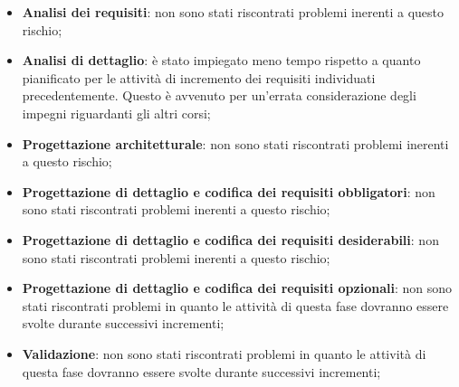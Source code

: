 			\begin{itemize}
				\item \textbf{Analisi dei requisiti}: non sono stati riscontrati problemi inerenti a questo rischio;
				\item \textbf{Analisi di dettaglio}: è stato impiegato meno tempo rispetto a quanto pianificato per le attività di incremento dei requisiti individuati precedentemente. Questo è avvenuto per un'errata considerazione degli impegni riguardanti gli altri corsi;
				\item \textbf{Progettazione architetturale}: non sono stati riscontrati problemi inerenti a questo rischio;
				\item \textbf{Progettazione di dettaglio e codifica dei requisiti obbligatori}: non sono stati riscontrati problemi inerenti a questo rischio;
				\item \textbf{Progettazione di dettaglio e codifica dei requisiti desiderabili}: non sono stati riscontrati problemi inerenti a questo rischio;
				\item \textbf{Progettazione di dettaglio e codifica dei requisiti opzionali}: non sono stati riscontrati problemi in quanto le attività di questa fase dovranno essere svolte durante successivi incrementi;
				\item \textbf{Validazione}: non sono stati riscontrati problemi in quanto le attività di questa fase dovranno essere svolte durante successivi incrementi;
			\end{itemize}



	\newpage
